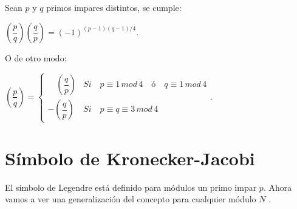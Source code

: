 \begin{theorem}
	Sean $p$ y $q$ primos impares distintos, se cumple:
	
	\begin{center}
		$
	\left( \dfrac{p}{q} \right) 	\left( \dfrac{q}{p} \right) = \left( -1 \right) ^{(p-1)(q-1)/4}
	$.
	\end{center}
	O de otro modo:
	
	\begin{center}
		$
		\left({\dfrac p q}\right) = \begin{cases}
		\quad \left({\dfrac q p}\right) & Si\quad p \equiv 1 \, mod \, 4 \quad  ó \quad  q \equiv 1 \, mod \, 4 \\
		-\left({\dfrac q p}\right) & Si\quad p \equiv q \equiv 3 \, mod \, 4
		\end{cases}
		$.
	\end{center}
	
	\label{quadRec:theo}
	
	
\end{theorem}



\hfil

\section{Símbolo de Kronecker-Jacobi}

El símbolo de Legendre está definido para módulos un primo impar $p$. Ahora vamos a ver una generalización del concepto para cualquier módulo $N$ .

